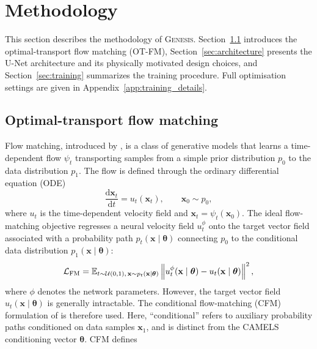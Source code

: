 \documentclass[usenatbib]{mnras}
\newcommand{\thetavec}{\boldsymbol{\theta}}
\begin{document}
\section{Methodology}
\label{sec:methods}
This section describes the methodology of \textsc{Genesis}.
Section~\ref{sec:flow_matching} introduces the optimal-transport flow
matching (OT-FM), Section~\ref{sec:architecture} presents
the U-Net architecture and its physically motivated design choices,
and Section~\ref{sec:training} summarizes the training procedure.
Full optimisation settings are given in Appendix~\ref{app:training_details}.

\subsection{Optimal-transport flow matching}
\label{sec:flow_matching}
Flow matching, introduced by \citet{Lipman2023}, is a class of
generative models that learns a time-dependent flow $\psi_t$
transporting samples from a simple prior distribution $p_0$ to the
data distribution $p_1$. The flow is defined through the ordinary
differential equation (ODE)
\begin{equation}
  \frac{\mathrm{d}\mathbf{x}_t}{\mathrm{d}t}
  =
  u_t(\mathbf{x}_t),
  \qquad
  \mathbf{x}_0\sim p_0,
  \label{eq:flow_ode}
\end{equation}
where $u_t$ is the time-dependent velocity field and
$\mathbf{x}_t=\psi_t(\mathbf{x}_0)$.
The ideal flow-matching objective regresses a neural velocity field
$u_t^\phi$ onto the target vector field associated with a probability
path $p_t(\mathbf{x}\mid\thetavec)$ connecting $p_0$ to the conditional
data distribution $p_1(\mathbf{x}\mid\thetavec)$:
\begin{equation}
  \mathcal{L}_{\rm FM} =
  \mathbb{E}_{t\sim\mathcal{U}(0,1),\,
  \mathbf{x}\sim p_t(\mathbf{x}\mid\thetavec)}
  \left\|
    u_t^\phi(\mathbf{x}\mid\thetavec)
    -
    u_t(\mathbf{x}\mid\thetavec)
  \right\|^2 ,
  \label{eq:fm}
\end{equation}
where $\phi$ denotes the network parameters. However, the target vector
field $u_t(\mathbf{x}\mid\thetavec)$ is generally intractable. The
conditional flow-matching (CFM) formulation of \citet{Lipman2023} is
therefore used. Here, ``conditional'' refers to auxiliary
probability paths conditioned on data samples $\mathbf{x}_1$, and is
distinct from the CAMELS conditioning vector $\thetavec$. CFM defines
\end{document}
